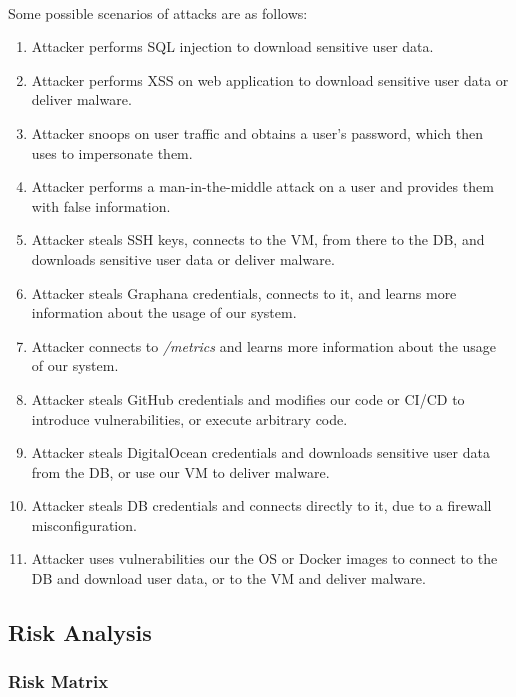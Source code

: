 \paragraph{} Some possible scenarios of attacks are as follows:
\begin{enumerate}
	\item Attacker performs SQL injection to download sensitive user data.
	\item Attacker performs XSS on web application to download sensitive user data or deliver malware.
	\item Attacker snoops on user traffic and obtains a user's password, which then uses to impersonate them.
	\item Attacker performs a man-in-the-middle attack on a user and provides them with false information.
	\item Attacker steals SSH keys, connects to the VM, from there to the DB, and downloads sensitive user data or deliver malware.
	\item Attacker steals Graphana credentials, connects to it, and learns more information about the usage of our system.
	\item Attacker connects to \textit{/metrics} and learns more information about the usage of our system.
	\item Attacker steals GitHub credentials and modifies our code or CI/CD to introduce vulnerabilities, or execute arbitrary code.
	\item Attacker steals DigitalOcean credentials and downloads sensitive user data from the DB, or use our VM to deliver malware.
	\item Attacker steals DB credentials and connects directly to it, due to a firewall misconfiguration.
	\item Attacker uses vulnerabilities our the OS or Docker images to connect to the DB and download user data, or to the VM and deliver malware.
\end{enumerate}

\subsection{Risk Analysis}
\subsubsection{Risk Matrix}
